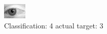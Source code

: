 \begin{figure}[h!]
\begin{center}
\includegraphics[width=0.60\columnwidth]{figures/ID2793_class_4_target_3.png}
\end{center}
\caption{ Classification: 4 actual target: 3}
\label{fig:ID2793_class_4_target_3}
\end{figure}

